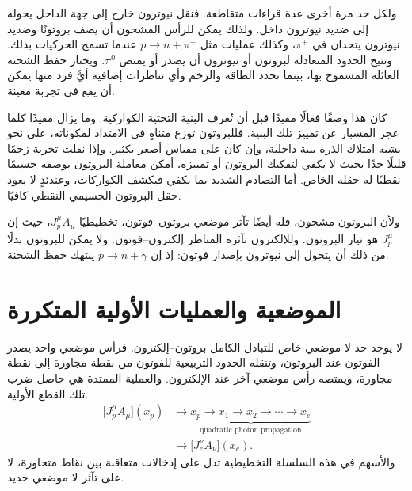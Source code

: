 ولكل حد مرة أخرى عدة قراءات متقاطعة. فنقل نيوترون خارج إلى جهة الداخل يحوله إلى ضديد نيوترون داخل. ولذلك يمكن للرأس المشحون أن يصف بروتونًا وضديد نيوترون يتحدان في \(\pi^+\)، وكذلك عمليات مثل \(p\to n+\pi^+\) عندما تسمح الحركيات بذلك. وتتيح الحدود المتعادلة لبروتون أو نيوترون أن يصدر أو يمتص \(\pi^0\). ويختار حفظ الشحنة العائلة المسموح بها، بينما تحدد الطاقة والزخم وأي تناظرات إضافية أيَّ فرد منها يمكن أن يقع في تجربة معينة.

كان هذا وصفًا فعالًا مفيدًا قبل أن تُعرف البنية التحتية الكواركية. وما يزال مفيدًا كلما عجز المسبار عن تمييز تلك البنية. فللبروتون توزع متناهٍ في الامتداد لمكوناته، على نحو يشبه امتلاك الذرة بنية داخلية، وإن كان على مقياس أصغر بكثير. وإذا نقلت تجربة زخمًا قليلًا جدًا بحيث لا يكفي لتفكيك البروتون أو تمييزه، أمكن معاملة البروتون بوصفه جسيمًا نقطيًا له حقله الخاص. أما التصادم الشديد بما يكفي فيكشف الكواركات، وعندئذٍ لا يعود حقل البروتون الجسيمي النقطي كافيًا.

ولأن البروتون مشحون، فله أيضًا تآثر موضعي بروتون--فوتون، تخطيطيًا \(J_p^\mu A_\mu\)، حيث إن \(J_p^\mu\) هو تيار البروتون. وللإلكترون تآثره المناظر إلكترون--فوتون. ولا يمكن للبروتون بدلًا من ذلك أن يتحول إلى نيوترون بإصدار فوتون: إذ إن \(p\to n+\gamma\) ينتهك حفظ الشحنة.

\begin{classroomqa}
\end{classroomqa}

\section{الموضعية والعمليات الأولية المتكررة}

لا يوجد حد لا موضعي خاص للتبادل الكامل بروتون--إلكترون. فرأس موضعي واحد يصدر الفوتون عند البروتون، وتنقله الحدود التربيعية للفوتون من نقطة مجاورة إلى نقطة مجاورة، ويمتصه رأس موضعي آخر عند الإلكترون. والعملية الممتدة هي حاصل ضرب تلك القطع الأولية.
\begin{equation}
\begin{aligned}
\bigl[J_p^\mu A_\mu\bigr](x_p)
&\longrightarrow
\underbrace{x_p\to x_1\to x_2\to\cdots\to x_e}_{\text{quadratic photon propagation}}
\\
&\longrightarrow
\bigl[J_e^\nu A_\nu\bigr](x_e).
\end{aligned}
\end{equation}
والأسهم في هذه السلسلة التخطيطية تدل على إدخالات متعاقبة بين نقاط متجاورة، لا على تآثر لا موضعي جديد.

